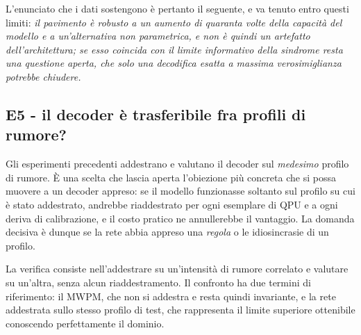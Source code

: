 L'enunciato che i dati sostengono è pertanto il seguente, e va tenuto entro questi limiti: \emph{il pavimento è robusto a un aumento di quaranta volte della capacità del modello e a un'alternativa non parametrica, e non è quindi un artefatto dell'architettura; se esso coincida con il limite informativo della sindrome resta una questione aperta, che solo una decodifica esatta a massima verosimiglianza potrebbe chiudere.}

\subsection{E5 - il decoder è trasferibile fra profili di rumore?}
\label{subsec:neural_generalizzazione}

Gli esperimenti precedenti addestrano e valutano il decoder sul \emph{medesimo} profilo di rumore. È una scelta che lascia aperta l'obiezione più concreta che si possa muovere a un decoder appreso: se il modello funzionasse soltanto sul profilo su cui è stato addestrato, andrebbe riaddestrato per ogni esemplare di \ac{QPU} e a ogni deriva di calibrazione, e il costo pratico ne annullerebbe il vantaggio. La domanda decisiva è dunque se la rete abbia appreso una \emph{regola} o le idiosincrasie di un profilo.

La verifica consiste nell'addestrare su un'intensità di rumore correlato e valutare su un'altra, senza alcun riaddestramento. Il confronto ha due termini di riferimento: il \ac{MWPM}, che non si addestra e resta quindi invariante, e la rete addestrata sullo stesso profilo di test, che rappresenta il limite superiore ottenibile conoscendo perfettamente il dominio.

